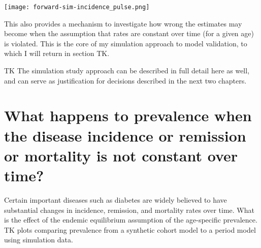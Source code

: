 \texttt{[image: forward-sim-incidence\_pulse.png]}

This also provides a mechanism to investigate how wrong the estimates
may become when the assumption that rates are constant over time (for
a given age) is violated. This is the core of my simulation approach
to model validation, to which I will return in section TK.

TK The simulation study approach can be described in full detail here
as well, and can serve as justification for decisions described in the
next two chapters.

\section{What happens to prevalence when the disease incidence or remission or mortality is not constant over time?}

Certain important diseases such as diabetes are widely believed to
have substantial changes in incidence, remission, and mortality rates
over time.  What is the effect of the endemic equilibrium assumption
of the age-specific prevalence. TK plots comparing prevalence from a
synthetic cohort model to a period model using simulation data.
